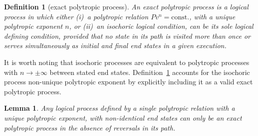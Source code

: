 \documentclass[fleqn,11pt]{SelfArx}
\newtheorem{definition}{Definition}
\newtheorem{lemma}{Lemma}
\begin{document}
    \begin{definition}[exact polytropic process]\label{def:exact.poly.proc}
        An exact polytropic process is a  logical  process  in  which  either  (i)~a  polytropic
        relation $Pv^n = \mbox{const.}$, with a  unique  polytropic  exponent  $n$,  or  (ii)~an
        isochoric logical condition, can be its sole logical defining condition,  provided  that
        no state in its path is visited more than once or serves simultaneously as  initial  and
        final end states in a given execution.
    \end{definition}

    It is worth noting that isochoric processes are equivalent to polytropic processes  with  $n
    \to \pm\infty$ between stated end states. Definition~\ref{def:exact.poly.proc} accounts  for
    the isochoric process non-unique polytropic exponent by explicitly including it as  a  valid
    exact polytropic process.

    \begin{lemma}\label{lemm:no.reversal}
        Any logical process defined by a single polytropic relation  with  a  unique  polytropic
        exponent, with non-identical end states can only be an exact polytropic process  in  the
        absence of reversals in its path.
    \end{lemma}
\end{document}
